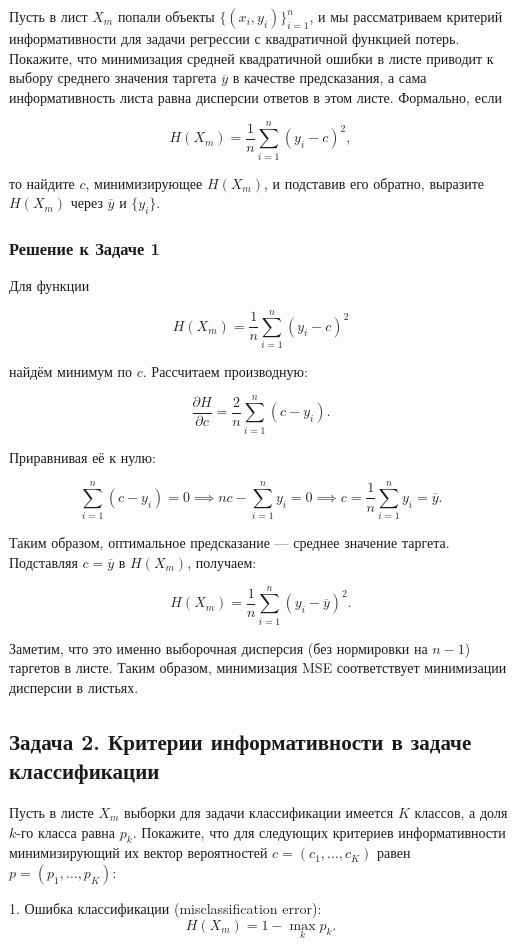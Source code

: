 Пусть в лист \(X_m\) попали объекты \(\{(x_i, y_i)\}_{i=1}^n\), и мы рассматриваем критерий информативности для задачи регрессии с квадратичной функцией потерь. Покажите, что минимизация средней квадратичной ошибки в листе приводит к выбору среднего значения таргета \(\overline{y}\) в качестве предсказания, а сама информативность листа равна дисперсии ответов в этом листе. Формально, если

\[
H(X_m) = \frac{1}{n} \sum_{i=1}^n (y_i - c)^2,
\]

то найдите \(c\), минимизирующее \(H(X_m)\), и подставив его обратно, выразите \(H(X_m)\) через \(\overline{y}\) и \(\{y_i\}\).

\subsubsection*{Решение к Задаче 1}

Для функции

\[
H(X_m) = \frac{1}{n} \sum_{i=1}^n (y_i - c)^2
\]

найдём минимум по \(c\). Рассчитаем производную:

\[
\frac{\partial H}{\partial c} = \frac{2}{n} \sum_{i=1}^n (c - y_i).
\]

Приравнивая её к нулю:

\[
\sum_{i=1}^n (c - y_i) = 0 \implies nc - \sum_{i=1}^n y_i = 0 \implies c = \frac{1}{n}\sum_{i=1}^n y_i = \overline{y}.
\]

Таким образом, оптимальное предсказание — среднее значение таргета. Подставляя \(c = \overline{y}\) в \(H(X_m)\), получаем:

\[
H(X_m) = \frac{1}{n} \sum_{i=1}^n (y_i - \overline{y})^2.
\]

Заметим, что это именно выборочная дисперсия (без нормировки на \(n-1\)) таргетов в листе. Таким образом, минимизация MSE соответствует минимизации дисперсии в листьях.


\subsection*{Задача 2. Критерии информативности в задаче классификации}

Пусть в листе \(X_m\) выборки для задачи классификации имеется \(K\) классов, а доля \(k\)-го класса равна \(p_k\). Покажите, что для следующих критериев информативности минимизирующий их вектор вероятностей \(c = (c_1, \ldots, c_K)\) равен \(p = (p_1, \ldots, p_K)\):

1. Ошибка классификации (misclassification error): 
\[
H(X_m) = 1 - \max_k p_k.
\]

